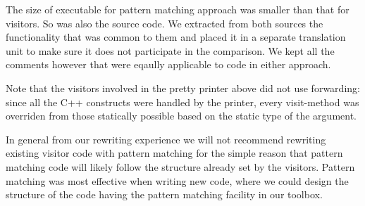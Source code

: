 The size of executable for pattern matching approach was smaller than that for 
visitors. So was also the source code. We extracted from both sources the 
functionality that was common to them and placed it in a separate translation 
unit to make sure it does not participate in the comparison. We kept all the 
comments however that were eqaully applicable to code in either approach.

Note that the visitors involved in the pretty printer above did not use 
forwarding: since all the C++ constructs were handled by the printer, every 
visit-method was overriden from those statically possible based on the static 
type of the argument.



In general from our rewriting experience we will not recommend rewriting 
existing visitor code with pattern matching for the simple reason that pattern 
matching code will likely follow the structure already set by the visitors. 
Pattern matching was most effective when writing new code, where we could design 
the structure of the code having the pattern matching facility in our toolbox.
